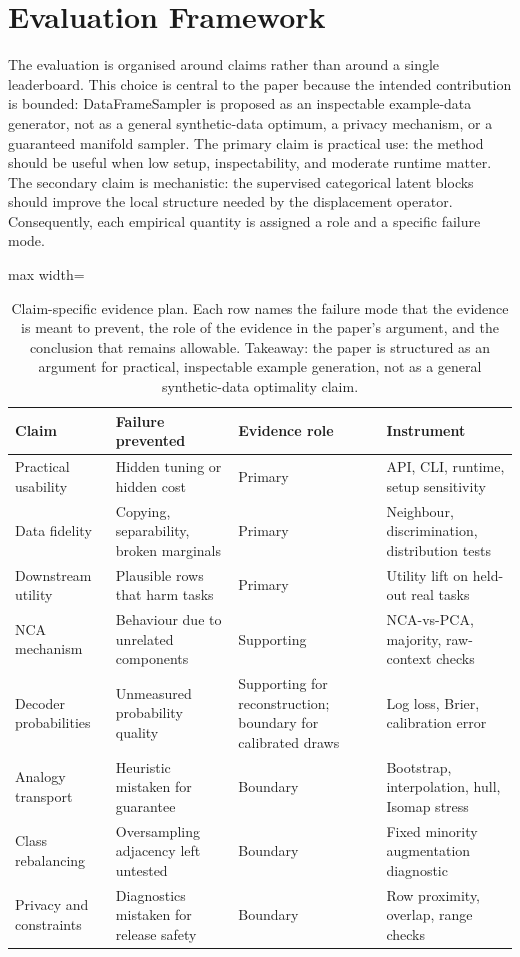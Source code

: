 \section{Evaluation Framework}
\label{sec:evaluation-framework}

The evaluation is organised around claims rather than around a single
leaderboard. This choice is central to the paper because the intended
contribution is bounded: DataFrameSampler is proposed as an inspectable
example-data generator, not as a general synthetic-data optimum, a privacy
mechanism, or a guaranteed manifold sampler. The primary claim is practical
use: the method should be useful when low setup, inspectability, and moderate
runtime matter. The secondary claim is mechanistic: the supervised categorical
latent blocks should improve the local structure needed by the displacement
operator. Consequently, each empirical quantity is assigned a role and a
specific failure mode.

\begin{table}[t]
\centering
\caption{Claim-specific evidence plan. Each row names the failure mode that the
evidence is meant to prevent, the role of the evidence in the paper's argument,
and the conclusion that remains allowable. Takeaway: the paper is structured as
an argument for practical, inspectable example generation, not as a general
synthetic-data optimality claim.}
\label{tab:claim-evidence}
\small
\begin{adjustbox}{max width=\textwidth}
\begin{tabular}{@{}llll@{}}
\toprule
Claim & Failure prevented & Evidence role & Instrument \\
\midrule
Practical usability & Hidden tuning or hidden cost & Primary & API, CLI, runtime, setup sensitivity \\
Data fidelity & Copying, separability, broken marginals & Primary & Neighbour, discrimination, distribution tests \\
Downstream utility & Plausible rows that harm tasks & Primary & Utility lift on held-out real tasks \\
NCA mechanism & Behaviour due to unrelated components & Supporting & NCA-vs-PCA, majority, raw-context checks \\
Decoder probabilities & Unmeasured probability quality & Supporting for reconstruction; boundary for calibrated draws & Log loss, Brier, calibration error \\
Analogy transport & Heuristic mistaken for guarantee & Boundary & Bootstrap, interpolation, hull, Isomap stress \\
Class rebalancing & Oversampling adjacency left untested & Boundary & Fixed minority augmentation diagnostic \\
Privacy and constraints & Diagnostics mistaken for release safety & Boundary & Row proximity, overlap, range checks \\
\bottomrule
\end{tabular}
\end{adjustbox}
\end{table}

